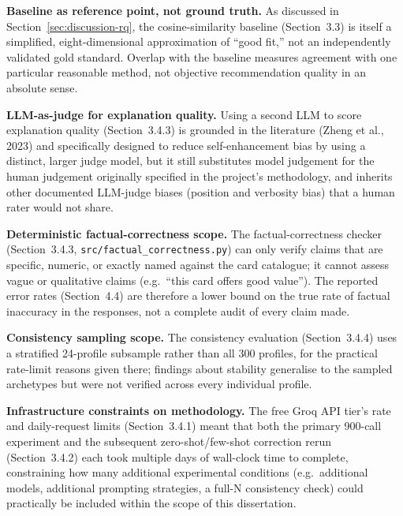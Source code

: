 \textbf{Baseline as reference point, not ground truth.} As discussed in Section~\ref{sec:discussion-rq}, the cosine-similarity baseline (Section~3.3) is itself a simplified, eight-dimensional approximation of ``good fit,'' not an independently validated gold standard. Overlap with the baseline measures agreement with one particular reasonable method, not objective recommendation quality in an absolute sense.

\textbf{LLM-as-judge for explanation quality.} Using a second LLM to score explanation quality (Section~3.4.3) is grounded in the literature (Zheng et al., 2023) and specifically designed to reduce self-enhancement bias by using a distinct, larger judge model, but it still substitutes model judgement for the human judgement originally specified in the project's methodology, and inherits other documented LLM-judge biases (position and verbosity bias) that a human rater would not share.

\textbf{Deterministic factual-correctness scope.} The factual-correctness checker (Section~3.4.3, \texttt{src/factual\_correctness.py}) can only verify claims that are specific, numeric, or exactly named against the card catalogue; it cannot assess vague or qualitative claims (e.g.\ ``this card offers good value''). The reported error rates (Section~4.4) are therefore a lower bound on the true rate of factual inaccuracy in the responses, not a complete audit of every claim made.

\textbf{Consistency sampling scope.} The consistency evaluation (Section~3.4.4) uses a stratified 24-profile subsample rather than all 300 profiles, for the practical rate-limit reasons given there; findings about stability generalise to the sampled archetypes but were not verified across every individual profile.

\textbf{Infrastructure constraints on methodology.} The free Groq API tier's rate and daily-request limits (Section~3.4.1) meant that both the primary 900-call experiment and the subsequent zero-shot/few-shot correction rerun (Section~3.4.2) each took multiple days of wall-clock time to complete, constraining how many additional experimental conditions (e.g.\ additional models, additional prompting strategies, a full-N consistency check) could practically be included within the scope of this dissertation.
